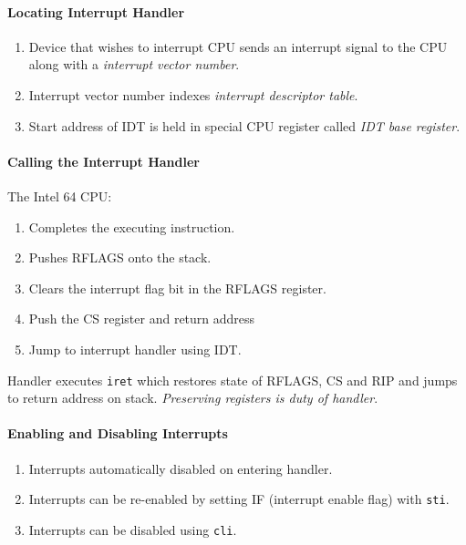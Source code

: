 \documentclass[twocolumn,english]{article}
\begin{document}
\paragraph{Locating Interrupt Handler}
\begin{enumerate}
\item Device that wishes to interrupt CPU sends an interrupt signal to the
CPU along with a \emph{interrupt vector number}.
\item Interrupt vector number indexes \emph{interrupt descriptor table}.
\item Start address of IDT is held in special CPU register called \emph{IDT
base register}.
\end{enumerate}

\paragraph{Calling the Interrupt Handler}

The Intel 64 CPU:
\begin{enumerate}
\item Completes the executing instruction.
\item Pushes RFLAGS onto the stack.
\item Clears the interrupt flag bit in the RFLAGS register.
\item Push the CS register and return address
\item Jump to interrupt handler using IDT.
\end{enumerate}
Handler executes \texttt{iret} which restores state of RFLAGS, CS
and RIP and jumps to return address on stack. \emph{Preserving registers
is duty of handler}.


\paragraph{Enabling and Disabling Interrupts}
\begin{enumerate}
\item Interrupts automatically disabled on entering handler.
\item Interrupts can be re-enabled by setting IF (interrupt enable flag)
with \texttt{sti}.
\item Interrupts can be disabled using \texttt{cli}.
\end{enumerate}
\end{document}
